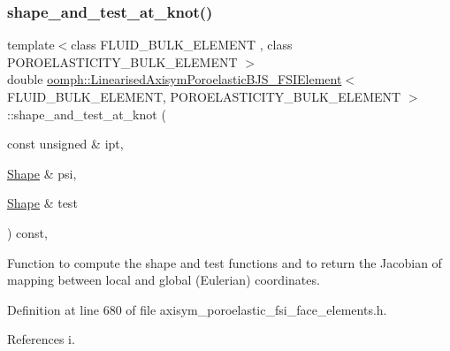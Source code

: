 \subsubsection{\texorpdfstring{shape\+\_\+and\+\_\+test\+\_\+at\+\_\+knot()}{shape\_and\_test\_at\_knot()}}
{\footnotesize\ttfamily template$<$class F\+L\+U\+I\+D\+\_\+\+B\+U\+L\+K\+\_\+\+E\+L\+E\+M\+E\+NT , class P\+O\+R\+O\+E\+L\+A\+S\+T\+I\+C\+I\+T\+Y\+\_\+\+B\+U\+L\+K\+\_\+\+E\+L\+E\+M\+E\+NT $>$ \\
double \hyperlink{classoomph_1_1LinearisedAxisymPoroelasticBJS__FSIElement}{oomph\+::\+Linearised\+Axisym\+Poroelastic\+B\+J\+S\+\_\+\+F\+S\+I\+Element}$<$ F\+L\+U\+I\+D\+\_\+\+B\+U\+L\+K\+\_\+\+E\+L\+E\+M\+E\+NT, P\+O\+R\+O\+E\+L\+A\+S\+T\+I\+C\+I\+T\+Y\+\_\+\+B\+U\+L\+K\+\_\+\+E\+L\+E\+M\+E\+NT $>$\+::shape\+\_\+and\+\_\+test\+\_\+at\+\_\+knot (\begin{DoxyParamCaption}\item[{const unsigned \&}]{ipt,  }\item[{\hyperlink{classoomph_1_1Shape}{Shape} \&}]{psi,  }\item[{\hyperlink{classoomph_1_1Shape}{Shape} \&}]{test }\end{DoxyParamCaption}) const\hspace{0.3cm}{\ttfamily [inline]}, {\ttfamily [protected]}}



Function to compute the shape and test functions and to return the Jacobian of mapping between local and global (Eulerian) coordinates. 



Definition at line 680 of file axisym\+\_\+poroelastic\+\_\+fsi\+\_\+face\+\_\+elements.\+h.



References i.

\mbox{\label{classoomph_1_1LinearisedAxisymPoroelasticBJS__FSIElement_a5dfd37623c3ea756028040a42db79b49}} 
